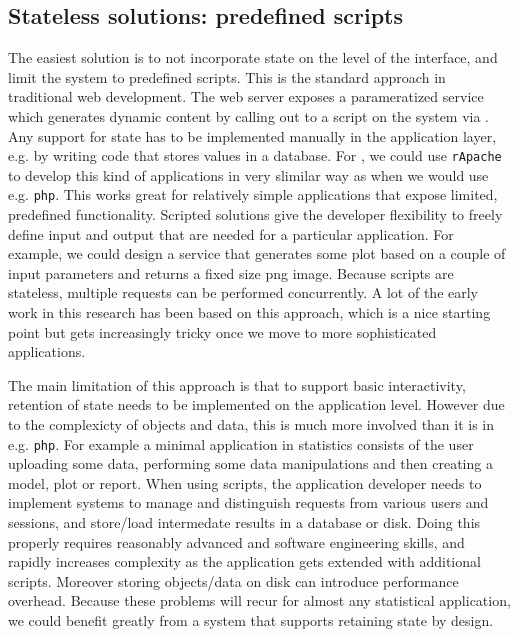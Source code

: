 \subsection{Stateless solutions: predefined scripts}

The easiest solution is to not incorporate state on the level of the interface, and limit the system to predefined scripts. This is the standard approach in traditional web development. The web server exposes a parameratized service which generates dynamic content by calling out to a script on the system via \CGI. Any support for state has to be implemented manually in the application layer, e.g. by writing code that stores values in a database. For \R, we could use \texttt{rApache} \citep{horner2013rapache} to develop this kind of applications in very slimilar way as when we would use e.g. \texttt{php}. This works great for relatively simple applications that expose limited, predefined functionality. Scripted solutions give the developer flexibility to freely define input and output that are needed for a particular application. For example, we could design a service that generates some plot based on a couple of input parameters and returns a fixed size png image. Because scripts are stateless, multiple requests can be performed concurrently. A lot of the early work in this research has been based on this approach, which is a nice starting point but gets increasingly tricky once we move to more sophisticated applications.

The main limitation of this approach is that to support basic interactivity, retention of state needs to be implemented on the application level. However due to the complexicty of objects and data, this is much more involved than it is in e.g. \texttt{php}. For example a minimal application in statistics consists of the user uploading some data, performing some data manipulations and then creating a model, plot or report. When using scripts, the application developer needs to implement systems to manage and distinguish requests from various users and sessions, and store/load intermedate results in a database or disk. Doing this properly requires reasonably advanced \R and software engineering skills, and rapidly increases complexity as the application gets extended with additional scripts. Moreover storing objects/data on disk can introduce performance overhead. Because these problems will recur for almost any statistical application, we could benefit greatly from a system that supports retaining state by design.

